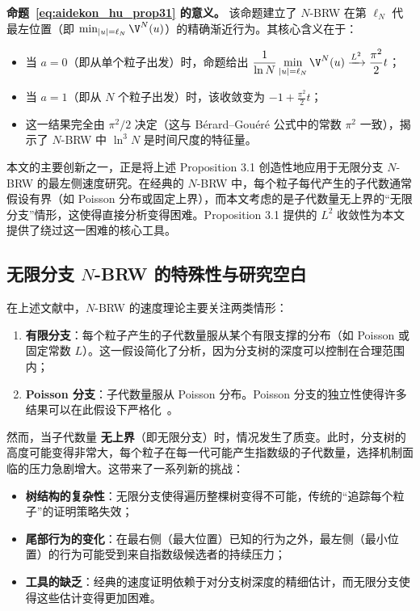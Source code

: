 \textbf{命题~\eqref{eq:aidekon_hu_prop31} 的意义。}
该命题建立了 $N$-BRW 在第 $\ell_N$ 代最左位置（即 $\min_{|u|=\ell_N}\V^N(u)$）的精确渐近行为。其核心含义在于：

\begin{itemize}
\item 当 $a=0$（即从单个粒子出发）时，命题给出 $\displaystyle\frac{1}{\ln N}\min_{|u|=\ell_N}\V^N(u)\xrightarrow{L^2}\frac{\pi^2}{2}t$；
\item 当 $a=1$（即从 $N$ 个粒子出发）时，该收敛变为 $-1+\frac{\pi^2}{2}t$；
\item 这一结果完全由 $\pi^2/2$ 决定（这与 Bérard--Gouéré 公式中的常数 $\pi^2$ 一致），揭示了 $N$-BRW 中 $\ln^3 N$ 是时间尺度的特征量。
\end{itemize}

本文的主要创新之一，正是将上述 Proposition 3.1 创造性地应用于无限分支 $N$-BRW 的最左侧速度研究。在经典的 $N$-BRW 中，每个粒子每代产生的子代数通常假设有界（如 Poisson 分布或固定上界），而本文考虑的是子代数量无上界的``无限分支''情形，这使得直接分析变得困难。Proposition 3.1 提供的 $L^2$ 收敛性为本文提供了绕过这一困难的核心工具。

\subsection{无限分支 $N$-BRW 的特殊性与研究空白}
\label{ssec:infinite_branching_gap}

在上述文献中，$N$-BRW 的速度理论主要关注两类情形：

\begin{enumerate}
\item \textbf{有限分支}：每个粒子产生的子代数量服从某个有限支撑的分布（如 Poisson 或固定常数 $L$）。这一假设简化了分析，因为分支树的深度可以控制在合理范围内；
\item \textbf{Poisson 分支}：子代数量服从 Poisson 分布。Poisson 分支的独立性使得许多结果可以在此假设下严格化~\cite{zhan2023}。
\end{enumerate}

然而，当子代数量 \textbf{无上界}（即无限分支）时，情况发生了质变。此时，分支树的高度可能变得非常大，每个粒子在每一代可能产生指数级的子代数量，选择机制面临的压力急剧增大。这带来了一系列新的挑战：

\begin{itemize}
\item \textbf{树结构的复杂性}：无限分支使得遍历整棵树变得不可能，传统的``追踪每个粒子''的证明策略失效；
\item \textbf{尾部行为的变化}：在最右侧（最大位置）已知的行为之外，最左侧（最小位置）的行为可能受到来自指数级候选者的持续压力；
\item \textbf{工具的缺乏}：经典的速度证明依赖于对分支树深度的精细估计，而无限分支使得这些估计变得更加困难。
\end{itemize}

